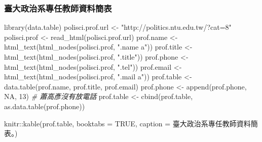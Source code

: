 \documentclass[
]{book}
\newenvironment{Shaded}{\begin{snugshade}}{\end{snugshade}}
\newcommand{\AttributeTok}[1]{\textcolor[rgb]{0.77,0.63,0.00}{#1}}
\newcommand{\CommentTok}[1]{\textcolor[rgb]{0.56,0.35,0.01}{\textit{#1}}}
\newcommand{\ConstantTok}[1]{\textcolor[rgb]{0.00,0.00,0.00}{#1}}
\newcommand{\DecValTok}[1]{\textcolor[rgb]{0.00,0.00,0.81}{#1}}
\newcommand{\FunctionTok}[1]{\textcolor[rgb]{0.00,0.00,0.00}{#1}}
\newcommand{\NormalTok}[1]{#1}
\newcommand{\OtherTok}[1]{\textcolor[rgb]{0.56,0.35,0.01}{#1}}
\newcommand{\SpecialCharTok}[1]{\textcolor[rgb]{0.00,0.00,0.00}{#1}}
\newcommand{\StringTok}[1]{\textcolor[rgb]{0.31,0.60,0.02}{#1}}
\theoremstyle{definition}
\theoremstyle{remark}
\begin{document}
\hypertarget{ux81faux5927ux653fux6cbbux7cfbux5c08ux4efbux6559ux5e2bux8cc7ux6599ux7c21ux8868}{%
\subsubsection{臺大政治系專任教師資料簡表}\label{ux81faux5927ux653fux6cbbux7cfbux5c08ux4efbux6559ux5e2bux8cc7ux6599ux7c21ux8868}}

\begin{Shaded}
\begin{Highlighting}[]
\FunctionTok{library}\NormalTok{(data.table)}
\NormalTok{polisci.prof.url }\OtherTok{\textless{}{-}} \StringTok{"http://politics.ntu.edu.tw/?cat=8"}
\NormalTok{polisci.prof }\OtherTok{\textless{}{-}} \FunctionTok{read\_html}\NormalTok{(polisci.prof.url)}
\NormalTok{prof.name }\OtherTok{\textless{}{-}} \FunctionTok{html\_text}\NormalTok{(}\FunctionTok{html\_nodes}\NormalTok{(polisci.prof, }\StringTok{".name a"}\NormalTok{))}
\NormalTok{prof.title }\OtherTok{\textless{}{-}} \FunctionTok{html\_text}\NormalTok{(}\FunctionTok{html\_nodes}\NormalTok{(polisci.prof, }\StringTok{".title"}\NormalTok{))}
\NormalTok{prof.phone }\OtherTok{\textless{}{-}} \FunctionTok{html\_text}\NormalTok{(}\FunctionTok{html\_nodes}\NormalTok{(polisci.prof, }\StringTok{".tel"}\NormalTok{))}
\NormalTok{prof.email }\OtherTok{\textless{}{-}} \FunctionTok{html\_text}\NormalTok{(}\FunctionTok{html\_nodes}\NormalTok{(polisci.prof, }\StringTok{".mail a"}\NormalTok{))}
\NormalTok{prof.table }\OtherTok{\textless{}{-}} \FunctionTok{data.table}\NormalTok{(prof.name, prof.title, prof.email)}
\NormalTok{prof.phone }\OtherTok{\textless{}{-}} \FunctionTok{append}\NormalTok{(prof.phone, }\ConstantTok{NA}\NormalTok{, }\DecValTok{13}\NormalTok{)  }\CommentTok{\# 蕭高彥沒有放電話}
\NormalTok{prof.table }\OtherTok{\textless{}{-}} \FunctionTok{cbind}\NormalTok{(prof.table, }\FunctionTok{as.data.table}\NormalTok{(prof.phone))}
\end{Highlighting}
\end{Shaded}

\begin{Shaded}
\begin{Highlighting}[]
\NormalTok{knitr}\SpecialCharTok{::}\FunctionTok{kable}\NormalTok{(prof.table, }\AttributeTok{booktabs =} \ConstantTok{TRUE}\NormalTok{, }\AttributeTok{caption =} \StringTok{\textquotesingle{}臺大政治系專任教師資料簡表。\textquotesingle{}}\NormalTok{)}
\end{Highlighting}
\end{Shaded}
\end{document}
